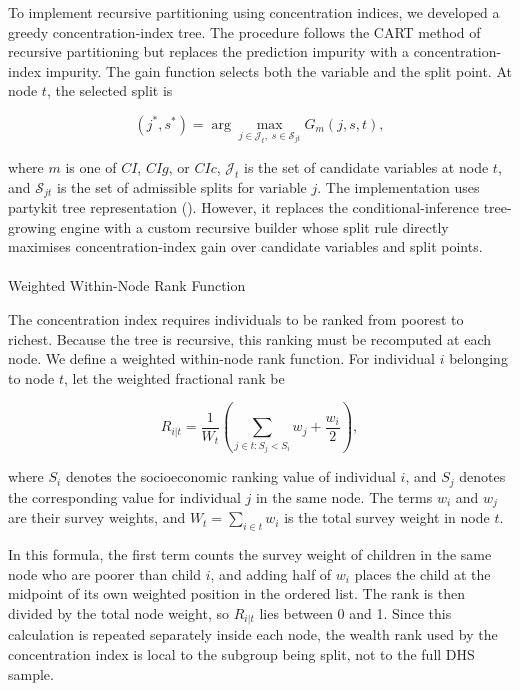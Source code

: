 \documentclass[
  11pt,
  a4paper,
]{article}
\makeatletter
\let\oldparagraph\paragraph
\renewcommand{\paragraph}{
    \@ifstar
      \xxxParagraphStar
      \xxxParagraphNoStar
  }
\newcommand{\xxxParagraphStar}[1]{\oldparagraph*{#1}\mbox{}}
\newcommand{\xxxParagraphNoStar}[1]{\oldparagraph{#1}\mbox{}}
\makeatother
\begin{document}
To implement recursive partitioning using concentration indices, we
developed a greedy concentration-index tree. The procedure follows the
CART method of recursive partitioning but replaces the prediction
impurity with a concentration-index impurity. The gain function selects
both the variable and the split point. At node \(t\), the selected split
is

\[
(j^*, s^*)
=
\arg\max_{j \in \mathcal{J}_t,\; s \in \mathcal{S}_{jt}}
G_m(j, s, t),
\]

where \(m\) is one of \(CI\), \(CIg\), or \(CIc\), \(\mathcal{J}_t\) is
the set of candidate variables at node \(t\), and \(\mathcal{S}_{jt}\)
is the set of admissible splits for variable \(j\). The implementation
uses partykit tree representation
().
However, it replaces the conditional-inference tree-growing engine with
a custom recursive builder whose split rule directly maximises
concentration-index gain over candidate variables and split points.

\paragraph{Weighted Within-Node Rank
Function}\label{sec-weighted-within-node-rank}

The concentration index requires individuals to be ranked from poorest
to richest. Because the tree is recursive, this ranking must be
recomputed at each node. We define a weighted within-node rank function.
For individual \(i\) belonging to node \(t\), let the weighted
fractional rank be

\[
R_{i|t}
=
\frac{1}{W_t}
\left(
\sum_{j \in t: S_j < S_i} w_j + \frac{w_i}{2}
\right),
\]

where \(S_i\) denotes the socioeconomic ranking value of individual
\(i\), and \(S_j\) denotes the corresponding value for individual \(j\)
in the same node. The terms \(w_i\) and \(w_j\) are their survey
weights, and \(W_t = \sum_{i \in t} w_i\) is the total survey weight in
node \(t\).

In this formula, the first term counts the survey weight of children in
the same node who are poorer than child \(i\), and adding half of
\(w_i\) places the child at the midpoint of its own weighted position in
the ordered list. The rank is then divided by the total node weight, so
\(R_{i|t}\) lies between 0 and 1. Since this calculation is repeated
separately inside each node, the wealth rank used by the concentration
index is local to the subgroup being split, not to the full DHS sample.
\end{document}
